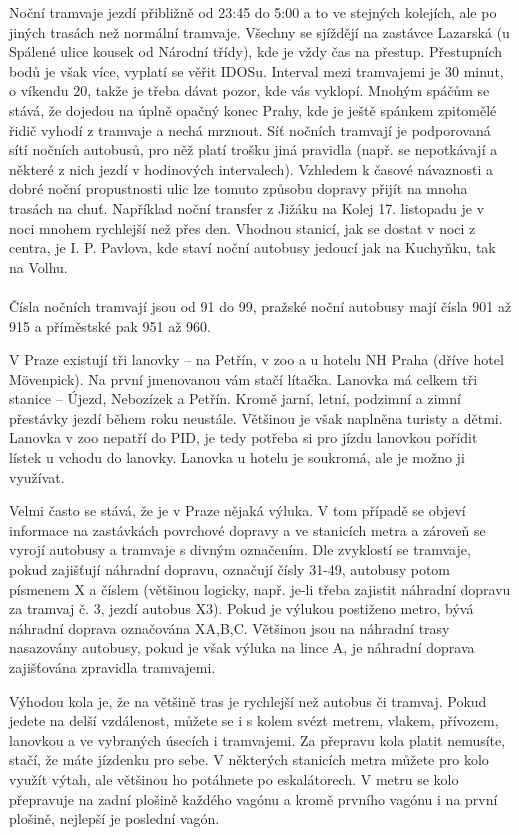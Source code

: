 Noční tramvaje jezdí přibližně od 23:45 do 5:00 a to ve stejných kolejích, ale
po jiných trasách než normální tramvaje. Všechny se sjíždějí na zastávce
Lazarská (u Spálené ulice kousek od Národní třídy), kde je vždy čas na přestup.
Přestupních bodů je však více, vyplatí se věřit IDOSu. Interval mezi tramvajemi
je 30 minut, o víkendu 20, takže je třeba dávat pozor, kde vás vyklopí. Mnohým
spáčům se stává, že dojedou na úplně opačný konec Prahy, kde je ještě spánkem
zpitomělé řidič vyhodí z tramvaje a nechá mrznout. Síť nočních tramvají je
podporovaná sítí nočních autobusů, pro něž platí trošku jiná pravidla (např. se
nepotkávají a některé z nich jezdí v hodinových intervalech). Vzhledem k časové
návaznosti a dobré noční propustnosti ulic lze tomuto způsobu dopravy přijít na
mnoha trasách na chuť. Například noční transfer z Jižáku na Kolej 17. listopadu
je v noci mnohem rychlejší než přes den. Vhodnou stanicí, jak se dostat v noci z
centra, je I. P. Pavlova, kde staví noční autobusy jedoucí jak na Kuchyňku, tak
na Volhu.
\\\\
Čísla nočních tramvají jsou od 91 do 99, pražské noční autobusy mají čísla 901
až 915 a příměstské pak 951 až 960.

V Praze existují tři lanovky – na Petřín, v zoo a u hotelu NH Praha (dříve hotel
Mövenpick). Na první jmenovanou vám stačí lítačka. Lanovka má celkem tři stanice
– Újezd, Nebozízek a Petřín. Kromě jarní, letní, podzimní a zimní přestávky
jezdí během roku neustále. Většinou je však naplněna turisty a dětmi. Lanovka v
zoo nepatří do PID, je tedy potřeba si pro jízdu lanovkou pořídit lístek u
vchodu do lanovky. Lanovka u hotelu je soukromá, ale je možno ji využívat.

Velmi často se stává, že je v Praze nějaká výluka. V tom případě se objeví
informace na zastávkách povrchové dopravy a ve stanicích metra a zároveň se
vyrojí autobusy a tramvaje s divným označením. Dle zvyklostí se tramvaje, pokud
zajišťují náhradní dopravu, označují čísly 31-49, autobusy potom písmenem X a
číslem (většinou logicky, např. je-li třeba zajistit náhradní dopravu za tramvaj
č. 3, jezdí autobus X3). Pokud je výlukou postiženo metro, bývá náhradní doprava
označována X{A,B,C}. Většinou jsou na náhradní trasy nasazovány autobusy, pokud
je však výluka na lince A, je náhradní doprava zajišťována zpravidla tramvajemi.

Výhodou kola je, že na většině tras je rychlejší než autobus či tramvaj. Pokud
jedete na delší vzdálenost, můžete se i s kolem svézt metrem, vlakem, přívozem,
lanovkou a ve vybraných úsecích i tramvajemi. Za přepravu kola platit nemusíte,
stačí, že máte jízdenku pro sebe. V některých stanicích metra můžete pro kolo
využít výtah, ale většinou ho potáhnete po eskalátorech. V metru se kolo
přepravuje na zadní plošině každého vagónu a kromě prvního vagónu i na první
plošině, nejlepší je poslední vagón.

